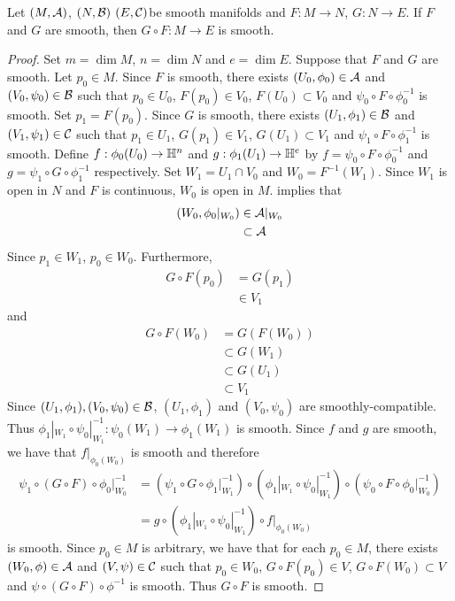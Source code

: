 \documentclass{book}
\begin{document}
\begin{ex} 
	Let $(M, \mathcal{A})$, $(N, \mathcal{B})$ $(E, \mathcal{C})$be smooth manifolds and $F: M \rightarrow N$, $G: N \rightarrow E$. If $F$ and $G$ are smooth, then $G \circ F: M \rightarrow E$ is smooth.  
\end{ex}

\begin{proof}
	Set $m = \dim M$, $n = \dim N$ and $e = \dim E$. Suppose that $F$ and $G$ are smooth. Let $p_0 \in M$. Since $F$ is smooth, there exists $(U_0, \phi_0) \in \mathcal{A}$ and $(V_0, \psi_0) \in \mathcal{B}$ such that $p_0 \in U_0$, $F(p_0) \in V_0$, $F(U_0) \subset V_0$ and $\psi_0 \circ F \circ \phi_0^{-1}$ is smooth. Set $p_1 = F(p_0)$. Since $G$ is smooth, there exists $(U_1, \phi_1) \in \mathcal{B}$ and $(V_1, \psi_1) \in \mathcal{C}$ such that $p_1 \in U_1$, $G(p_1) \in V_1$, $G(U_1) \subset V_1$ and $\psi_1 \circ F \circ \phi_1^{-1}$ is smooth. Define $f:\phi_0(U_0) \rightarrow \mathbb{H}^n$ and $g: \phi_1(U_1) \rightarrow \mathbb{H}^e$ by $f = \psi_0 \circ F \circ \phi_0^{-1}$ and $g = \psi_1 \circ G \circ \phi_1^{-1}$ respectively. Set $W_1 = U_1 \cap V_0$ and $W_0 = F^{-1}(W_1)$. Since $W_1$ is open in $N$ and $F$ is continuous, $W_0$ is open in $M$.  implies that  
	\begin{align*}
		(W_0, \phi_0|_{W_0}) 
		& \in \mathcal{A}|_{W_0} \\
		& \subset \mathcal{A} 
	\end{align*}
	Since $p_1 \in W_1$, $p_0 \in W_0$. Furthermore, 
	\begin{align*}
		G \circ F (p_0)
		& = G(p_1) \\
		& \in V_1
	\end{align*}
	and 
	\begin{align*}
		G \circ F(W_0)
		& = G(F(W_0)) \\
		& \subset G(W_1) \\
		& \subset G(U_1) \\
		& \subset V_1
	\end{align*}
	Since $(U_1, \phi_1), (V_0, \psi_0) \in \mathcal{B}$, $(U_1, \phi_1)$ and $(V_0, \psi_0)$ are smoothly-compatible. Thus $\phi_1|_{W_1} \circ \psi_0|_{W_1}^{-1}: \psi_0(W_1) \rightarrow \phi_1(W_1)$ is smooth. Since $f$ and $g$ are smooth, we have that $f|_{\phi_0(W_0)}$ is smooth and therefore
	\begin{align*}
		\psi_1 \circ (G \circ F) \circ \phi_0|_{W_0}^{-1}
		& = (\psi_1 \circ G \circ \phi_1|_{W_1}^{-1}) \circ (\phi_1|_{W_1}  \circ \psi_0|_{W_1}^{-1}) \circ  (\psi_0 \circ F \circ \phi_0|_{W_0}^{-1}) \\
		& = g \circ (\phi_1|_{W_1}  \circ \psi_0|_{W_1}^{-1}) \circ f|_{\phi_0(W_0)}
	\end{align*}
	is smooth. Since $p_0 \in M$ is arbitrary, we have that for each $p_0 \in M$, there exists $(W_0, \phi) \in \mathcal{A}$ and $(V, \psi) \in \mathcal{C}$ such that $p_0 \in W_0$, $G \circ F(p_0) \in V$, $G \circ F(W_0) \subset V$ and $\psi \circ (G \circ F) \circ \phi^{-1}$ is smooth. Thus $G \circ F$ is smooth.
\end{proof}
\end{document}
